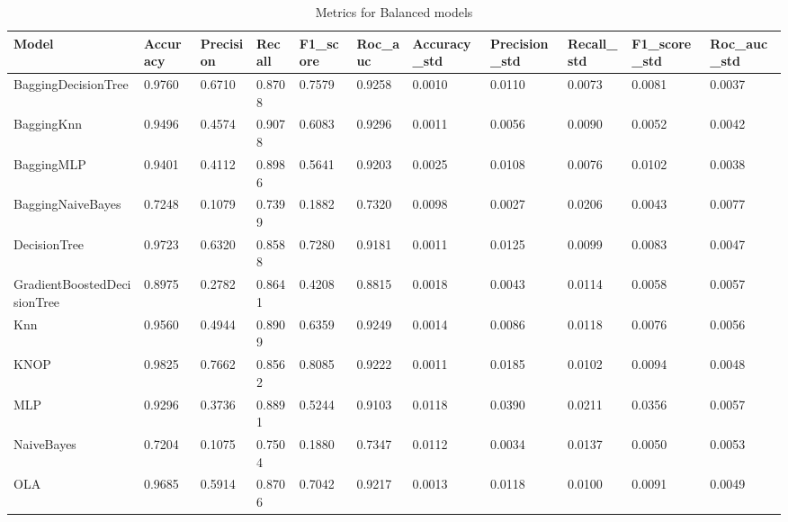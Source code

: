 
\begin{table}[h!]
    \centering
    \caption{Metrics for Balanced models}
    \label{tab:Balanced_metrics}
    \begin{tabular}{l|l|l|l|l|l|l|l|l|l|l}
\toprule
                      Model &  Accuracy &  Precision &  Recall &  F1\_score &  Roc\_auc &  Accuracy\_std &  Precision\_std &  Recall\_std &  F1\_score\_std &  Roc\_auc\_std \\
\midrule
        BaggingDecisionTree &    0.9760 &     0.6710 &  0.8708 &    0.7579 &   0.9258 &        0.0010 &         0.0110 &      0.0073 &        0.0081 &       0.0037 \\
                 BaggingKnn &    0.9496 &     0.4574 &  0.9078 &    0.6083 &   0.9296 &        0.0011 &         0.0056 &      0.0090 &        0.0052 &       0.0042 \\
                 BaggingMLP &    0.9401 &     0.4112 &  0.8986 &    0.5641 &   0.9203 &        0.0025 &         0.0108 &      0.0076 &        0.0102 &       0.0038 \\
          BaggingNaiveBayes &    0.7248 &     0.1079 &  0.7399 &    0.1882 &   0.7320 &        0.0098 &         0.0027 &      0.0206 &        0.0043 &       0.0077 \\
               DecisionTree &    0.9723 &     0.6320 &  0.8588 &    0.7280 &   0.9181 &        0.0011 &         0.0125 &      0.0099 &        0.0083 &       0.0047 \\
GradientBoostedDecisionTree &    0.8975 &     0.2782 &  0.8641 &    0.4208 &   0.8815 &        0.0018 &         0.0043 &      0.0114 &        0.0058 &       0.0057 \\
                        Knn &    0.9560 &     0.4944 &  0.8909 &    0.6359 &   0.9249 &        0.0014 &         0.0086 &      0.0118 &        0.0076 &       0.0056 \\
                       KNOP &    0.9825 &     0.7662 &  0.8562 &    0.8085 &   0.9222 &        0.0011 &         0.0185 &      0.0102 &        0.0094 &       0.0048 \\
                        MLP &    0.9296 &     0.3736 &  0.8891 &    0.5244 &   0.9103 &        0.0118 &         0.0390 &      0.0211 &        0.0356 &       0.0057 \\
                 NaiveBayes &    0.7204 &     0.1075 &  0.7504 &    0.1880 &   0.7347 &        0.0112 &         0.0034 &      0.0137 &        0.0050 &       0.0053 \\
                        OLA &    0.9685 &     0.5914 &  0.8706 &    0.7042 &   0.9217 &        0.0013 &         0.0118 &      0.0100 &        0.0091 &       0.0049 \\

\end{tabular}
\end{table}
